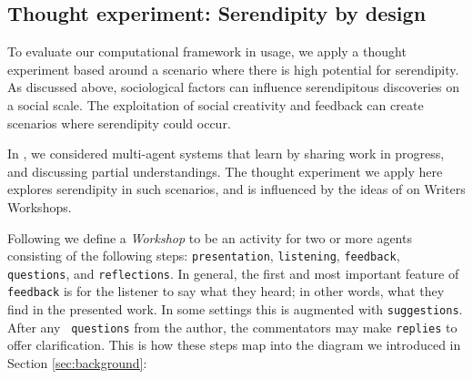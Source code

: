 \subsection{Thought experiment:  Serendipity by design} \label{sec:ww}

To evaluate our computational framework in usage, we apply a thought
experiment based around a scenario where there is high potential for
serendipity.  As discussed above, sociological factors can influence
serendipitous discoveries on a social scale.  The exploitation of
social creativity and feedback can create scenarios where serendipity
could occur.

In \cite{poetry-workshop}, we considered multi-agent systems that
learn by sharing work in progress, and discussing partial
understandings.  The thought experiment we apply here explores
serendipity in such scenarios, and is influenced by the ideas of
 on Writers Workshops.

Following 
we define a \emph{Workshop} to be an activity for two or more agents
consisting of the following steps:
{\tt presentation}, {\tt listening}, {\tt feedback}, {\tt questions},
and {\tt reflections}.  In general, the first and most important
feature of {\tt feedback} is for the listener to say what they heard;
in other words, what they find in the presented work.  In some
settings this is augmented with {\tt suggestions}.  After any {\tt
  questions} from the author, the commentators may make {\tt replies}
to offer clarification.
This is how these steps map into the diagram we introduced in Section \ref{sec:background}:


